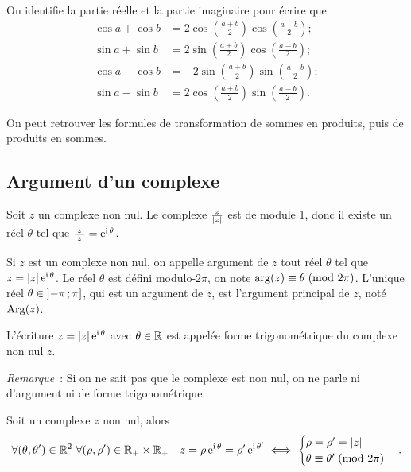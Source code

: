 On identifie la partie réelle et la partie imaginaire pour écrire que
\begin{align}
  \cos a + \cos b &= 2 \cos \left( \frac{a + b}{2} \right) \cos 
  \left(\frac{a-b}{2} \right);\\
  \sin a + \sin b &= 2 \sin \left( \frac{a + b}{2} \right) \cos 
  \left(\frac{a-b}{2} \right);\\
  \cos a - \cos b &= -2 \sin \left( \frac{a + b}{2} \right) \sin 
  \left(\frac{a-b}{2} \right);\\
  \sin a - \sin b &= 2 \cos \left( \frac{a + b}{2} \right) \sin 
  \left(\frac{a-b}{2} \right).
\end{align}

On peut retrouver les formules de transformation de sommes en produits, puis de 
produits en sommes.

\subsection{Argument d'un complexe}
\label{subsec:argumentcomplexe}

Soit \(z\) un complexe non nul. Le complexe \(\frac{z}{\left\lvert z\right\rvert}\) est de module 
1, donc il existe un réel \(\theta\) tel que 
\(\frac{z}{\left\lvert z\right\rvert} = \operatorname{e}^{\operatorname{i} \theta}\).

\begin{defdef}
  Si \(z\) est un complexe non nul, on appelle argument de \(z\) tout réel 
  \(\theta\) tel que \(z = \left\lvert z\right\rvert \operatorname{e}^{\operatorname{i} \theta}\).  Le réel \(\theta\) est 
  défini modulo-\(2\pi\), on note \(\arg(z) \equiv \theta\!\pmod {2\pi}\). L'unique 
  réel \(\theta \in \left] -\pi \, ;  \pi \right]\), qui est un argument de \(z\), 
  est l'argument principal de \(z\), noté \(\operatorname{Arg}(z)\).
\end{defdef}

L'écriture \(z = \left\lvert z\right\rvert \operatorname{e}^{\operatorname{i} \theta}\) avec \(\theta \in \mathbb{R}\) est appelée 
forme trigonométrique du complexe non nul \(z\).

\emph{Remarque}~: Si on ne sait pas que le complexe est non nul, on ne parle ni 
d'argument ni de forme trigonométrique.

\begin{prop}
  Soit un complexe \(z\) non nul, alors
  \begin{equation}
    \forall (\theta, \theta') \in \mathbb{R}^2 \ \forall (\rho, \rho') \in \mathbb{R}_{+} 
    \times \mathbb{R}_{+} \quad z = \rho \operatorname{e}^{\operatorname{i} \theta} = \rho' \operatorname{e}^{\operatorname{i} \theta'} 
    \iff
    \begin{cases}
      \rho = \rho' = \left\lvert z\right\rvert \\
      \theta \equiv \theta'\!\pmod {2\pi}
    \end{cases}.
  \end{equation}
\end{prop}

